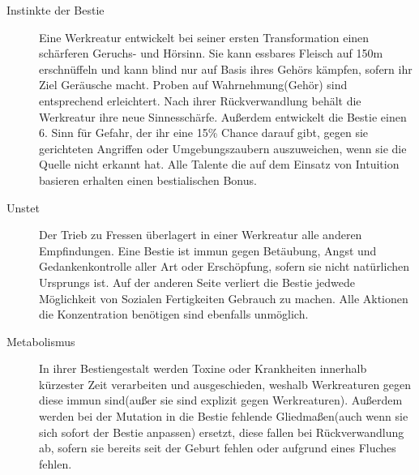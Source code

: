 \documentclass[a4paper,12pt,oneside]{book}
\begin{document}
\begin{description}
\begin{description}
\item[Instinkte der Bestie]
Eine Werkreatur entwickelt bei seiner ersten Transformation einen schärferen Geruchs- und Hörsinn. Sie kann essbares Fleisch  auf 150m erschnüffeln und kann blind nur auf Basis ihres Gehörs kämpfen, sofern ihr Ziel Geräusche macht. Proben auf Wahrnehmung(Gehör) sind entsprechend erleichtert. Nach ihrer Rückverwandlung behält die Werkreatur ihre neue Sinnesschärfe. Außerdem entwickelt die Bestie einen 6. Sinn für Gefahr, der ihr eine 15\% Chance darauf gibt, gegen sie gerichteten Angriffen oder Umgebungszaubern auszuweichen, wenn sie die Quelle nicht erkannt hat. Alle Talente die auf dem Einsatz von Intuition basieren erhalten einen bestialischen Bonus.
\item[Unstet]
Der Trieb zu Fressen überlagert in einer Werkreatur alle anderen Empfindungen. Eine Bestie ist immun gegen Betäubung, Angst und Gedankenkontrolle aller Art oder Erschöpfung, sofern sie nicht natürlichen Ursprungs ist. Auf der anderen Seite verliert die Bestie jedwede Möglichkeit von Sozialen Fertigkeiten Gebrauch zu machen. Alle Aktionen die Konzentration benötigen sind ebenfalls unmöglich.
\item[Metabolismus]In ihrer Bestiengestalt werden Toxine oder Krankheiten innerhalb kürzester Zeit verarbeiten und ausgeschieden, weshalb Werkreaturen gegen diese immun sind(außer sie sind explizit gegen Werkreaturen). Außerdem werden bei der Mutation in die Bestie fehlende Gliedmaßen(auch wenn sie sich sofort der Bestie anpassen) ersetzt, diese fallen bei Rückverwandlung ab, sofern sie bereits seit der Geburt fehlen oder aufgrund eines Fluches fehlen.
\end{description}


\end{description}
\end{document}
